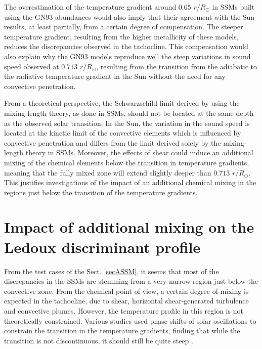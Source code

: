 \documentclass[a4paper,fleqn,usenatbib]{mnras}
\begin{document}
The overestimation of the temperature gradient around $0.65$ $r/R_{\odot}$ in SSMs built using the GN$93$ abundances would also imply that their agreement with the Sun results, at least partially, from a certain degree of compensation. The steeper temperature gradient, resulting from the higher metallicity of these models, reduces the discrepancies observed in the tachocline. This compensation would also explain why the GN$93$ models reproduce well the steep variations in sound speed observed at $0.713$ $r/R_{\odot}$, resulting from the transition from the adiabatic to the radiative temperature gradient in the Sun without the need for any convective penetration. 


From a theoretical perspective, the Schwarzschild limit derived by using the mixing-length theory, as done in SSMs, should not be located at the same depth as the observed solar transition. In the Sun, the variation in the sound speed is located at the kinetic limit of the convective elements which is influenced by convective penetration and differs from the limit derived solely by the mixing-length theory in SSMs. Moreover, the effects of shear could induce an additional mixing of the chemical elements below the transition in temperature gradients, meaning that the fully mixed zone will extend slightly deeper than $0.713$ $r/R_{\odot}$. This justifies investigations of the impact of an additional chemical mixing in the regions just below the transition of the temperature gradients.


\section{Impact of additional mixing on the Ledoux discriminant profile}

From the test cases of the Sect. \ref{secASSM}, it seems that most of the discrepancies in the SSMs are stemming from a very narrow region just below the convective zone. From the chemical point of view, a certain degree of mixing is expected in the tachocline, due to shear, horizontal shear-generated turbulence and convective plumes. However, the temperature profile in this region is not theoretically constrained. Various studies used phase shifts \citep{RoxVor94PhaseShift} of solar oscillations to constrain the transition in the temperature gradients, finding that while the transition is not discontinuous, it should still be quite steep \citep{MonteiroOne}. 
\end{document}
